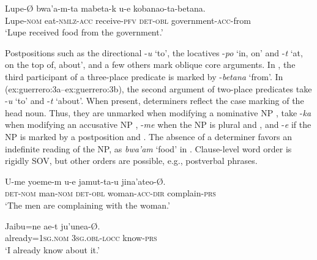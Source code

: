 \documentclass[output=paper]{langscibook}
\begin{document}
\ex
\label{ex:guerrero:2d}
\gll Lupe-Ø  bwa’a-m-ta   mabeta-k  u-e  kobanao-ta-betana.\\
    Lupe\textsc{{}-nom}   eat-\textsc{nmlz-acc}  receive-\textsc{pfv}  \textsc{det-obl}   government-\textsc{acc}{}-from\\
\glt ‘Lupe received food from the government.’
\z
\z



Postpositions such as the directional -\textit{u} ‘to’, the locatives -\textit{po} ‘in, on’ and -\textit{t} ‘at, on the top of, about’, and a few others mark oblique core arguments. In , the third participant of a three-place predicate is marked by -\textit{betana} ‘from’. In ({ex:guerrero:3a}--{ex:guerrero:3b}), the second argument of two-place predicates take -\textit{u} ‘to’ and -\textit{t} ‘about’.  When present, determiners reflect the case marking of the head noun. Thus, they are unmarked when modifying a nominative NP , take -\textit{ka} when modifying an accusative NP , -\textit{me} when the NP is plural  and , and -\textit{e} if the NP is marked by a postposition  and . The absence of a determiner favors an indefinite reading of the NP, as \textit{bwa’am} ‘food’ in . Clause-level word order is rigidly SOV, but other orders are possible, e.g., postverbal phrases.



\ea%
    \label{ex:guerrero:3}

\ea
\label{ex:guerrero:3a}
\gll U-me   yoeme-m  u-e  jamut-ta-u    jina’ateo-Ø.\\
  \textsc{det-nom}  man\textsc{{}-nom}  \textsc{det-obl}  woman-\textsc{acc-dir}    complain-\textsc{prs}\\
\glt ‘The men are complaining with the woman.’

\ex
\label{ex:guerrero:3b}
\gll Jaibu=ne    ae-t    ju’unea-Ø.\\
    already=\textsc{1sg.nom}  \textsc{3sg.obl-locc}  know\textsc{{}-prs}\\
\glt ‘I already know about it.’
\z
\z
\end{document}
